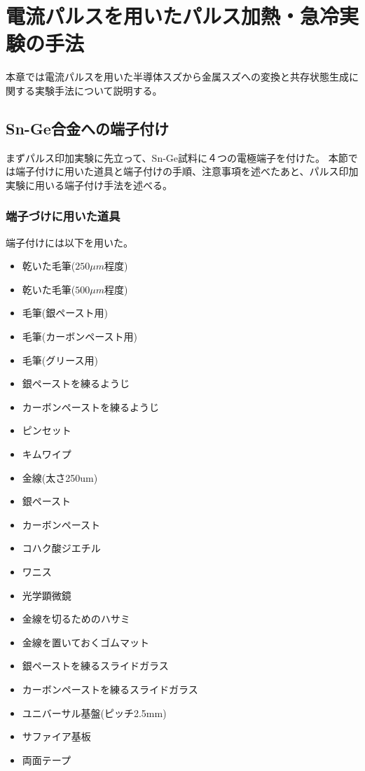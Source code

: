 \section{電流パルスを用いたパルス加熱・急冷実験の手法}
本章では電流パルスを用いた半導体スズから金属スズへの変換と共存状態生成に関する実験手法について説明する。

\subsection{Sn-Ge合金への端子付け}
まずパルス印加実験に先立って、Sn-Ge試料に４つの電極端子を付けた。
本節では端子付けに用いた道具と端子付けの手順、注意事項を述べたあと、パルス印加実験に用いる端子付け手法を述べる。

\subsubsection{端子づけに用いた道具}
端子付けには以下を用いた。
\begin{itemize}
\item 乾いた毛筆($250\mu m$程度)
\item 乾いた毛筆($500\mu m$程度)
\item 毛筆(銀ペースト用)
\item 毛筆(カーボンペースト用)
\item 毛筆(グリース用)
\item 銀ペーストを練るようじ
\item カーボンペーストを練るようじ
\item ピンセット
\item キムワイプ
\item 金線(太さ250um)
\item 銀ペースト
\item カーボンペースト
\item コハク酸ジエチル
\item ワニス
\item 光学顕微鏡
\item 金線を切るためのハサミ
\item 金線を置いておくゴムマット
\item 銀ペーストを練るスライドガラス
\item カーボンペーストを練るスライドガラス
\item ユニバーサル基盤(ピッチ2.5mm)
\item サファイア基板
\item 両面テープ
\end{itemize}

